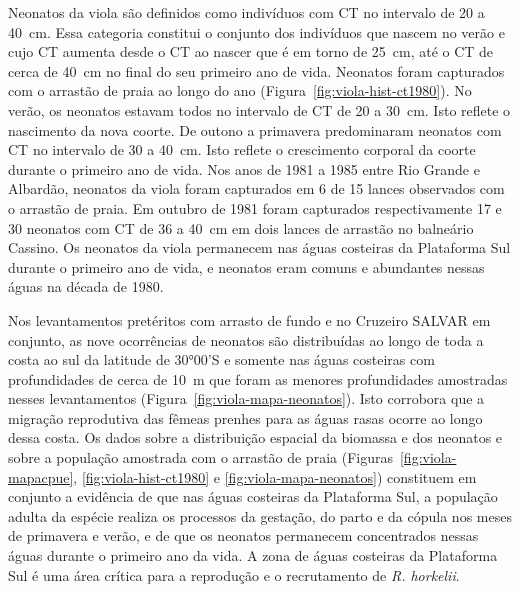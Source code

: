 \documentclass[a4paper,11pt,twoside,showtrims,onecolumn,openright,final]{memoir}
\begin{document}
Neonatos da viola são definidos como indivíduos com CT no intervalo de 20 a 40~cm. 
Essa categoria constitui o conjunto dos indivíduos que nascem no verão e cujo CT  
aumenta desde o CT ao nascer que é em torno de 25~cm, até o CT 
de cerca de 40~cm no final do seu primeiro ano de vida. Neonatos foram capturados com 
o arrastão de praia  ao longo do ano (Figura~\ref{fig:viola-hist-ct1980}). 
No verão,  os neonatos estavam todos 
no intervalo de CT de 20 a 30~cm. Isto reflete o nascimento da nova coorte. 
De outono a primavera predominaram neonatos com CT no intervalo de 30 a 40~cm.  
Isto reflete o crescimento corporal da coorte durante o primeiro ano de vida. 
Nos anos de 1981 a 1985 entre Rio Grande e Albardão, neonatos da viola foram 
capturados em 6 de 15 lances observados com o arrastão de praia. Em outubro de 1981 
foram capturados respectivamente 17 e 30 neonatos com CT de 36 a 40~cm em dois lances 
de arrastão no balneário Cassino. Os neonatos da viola permanecem nas águas 
costeiras da Plataforma Sul durante o primeiro ano de vida, e neonatos eram comuns 
e abundantes nessas águas na década de 1980. 

Nos levantamentos pretéritos com arrasto de fundo e no Cruzeiro SALVAR em conjunto, 
as nove ocorrências de neonatos são distribuídas ao longo de toda 
a costa ao sul da latitude de 30°00'S e somente nas águas costeiras 
com profundidades de cerca de 10~m que foram as menores profundidades 
amostradas nesses levantamentos (Figura~\ref{fig:viola-mapa-neonatos}). 
Isto  corrobora que a migração reprodutiva das fêmeas prenhes para as 
águas rasas ocorre ao longo dessa costa. Os dados sobre a distribuição espacial 
da biomassa e dos neonatos e sobre a população amostrada com o arrastão de praia 
(Figuras~\ref{fig:viola-mapacpue}, \ref{fig:viola-hist-ct1980} e \ref{fig:viola-mapa-neonatos}) 
constituem em conjunto a evidência de que nas águas costeiras da Plataforma Sul, 
a população adulta da espécie realiza os processos da gestação, do parto e da cópula nos 
meses de primavera e verão, e de que os neonatos permanecem concentrados nessas águas 
durante o primeiro ano da vida. A zona de águas costeiras da Plataforma Sul é uma área 
crítica para a reprodução e o recrutamento de \emph{R. horkelii}. 

%
%
\end{document}
